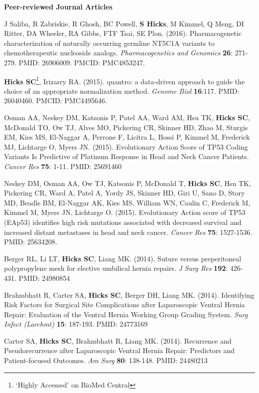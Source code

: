 \documentclass[10pt]{article}
\begin{document}
\textbf{Peer-reviewed Journal Articles}
\begin{enumerate}[label= {[\arabic*]}]
\item J Saliba, R Zabriskie, R Ghosh, BC Powell, {\bf S Hicks}, M Kimmel, Q Meng, DI Ritter, DA Wheeler, RA Gibbs, FTF Tsai, SE Plon. (2016). Pharmacogenetic characterization of naturally occurring germline NT5C1A variants to chemotherapeutic nucleoside analogs. {\it Pharmacogenetics and Genomics}  {\bf 26}: 271-279. PMID: 26906009. PMCID: PMC4853247. 
\item {\bf Hicks SC}\footnote{ `Highly Accessed' on BioMed Central}, Irizarry RA. (2015). quantro: a data-driven approach to guide the choice of an appropriate normalization method. {\it Genome Biol} {\bf 16}:117. PMID: 26040460. PMCID: PMC4495646. 
\item Osman AA, Neskey DM, Katsonis P, Patel AA, Ward AM, Hsu TK, {\bf Hicks SC}, McDonald TO, Ow TJ, Alves MO, Pickering CR, Skinner HD, Zhao M, Sturgis EM, Kies MS, El-Naggar A, Perrone F, Licitra L, Bossi P, Kimmel M, Frederick MJ, Lichtarge O, Myers JN. (2015). Evolutionary Action Score of TP53 Coding Variants Is Predictive of Platinum Response in Head and Neck Cancer Patients. {\it Cancer Res} {\bf 75}: 1-11. PMID: 25691460
\item Neskey DM, Osman AA, Ow TJ, Katsonis P, McDonald T, {\bf Hicks SC}, Hsu TK, Pickering CR, Ward A, Patel A, Yordy JS, Skinner HD, Giri U, Sano D, Story MD, Beadle BM, El-Naggar AK, Kies MS, William WN, Caulin C, Frederick M, Kimmel M, Myers JN, Lichtarge O. (2015). Evolutionary Action score of TP53 (EAp53) identifies high risk mutations associated with decreased survival and increased distant metastases in head and neck cancer. {\it Cancer Res} {\bf 75}: 1527-1536. PMID: 25634208.
\item Berger RL, Li LT, {\bf Hicks SC}, Liang MK. (2014). Suture versus preperitoneal polypropylene mesh for elective umbilical hernia repairs. {\it J Surg Res} {\bf 192}: 426-431. PMID: 24980854 
\item Brahmbhatt R, Carter SA, {\bf Hicks SC}, Berger DH, Liang MK. (2014). Identifying Risk Factors for Surgical Site Complications after Laparoscopic Ventral Hernia Repair: Evaluation of the Ventral Hernia Working Group Grading System. {\it Surg Infect (Larchmt)} {\bf 15}: 187-193. PMID: 24773169
\item Carter SA, {\bf Hicks SC}, Brahmbhatt R, Liang MK. (2014). Recurrence and Pseudorecurrence after Laparoscopic Ventral Hernia Repair: Predictors and Patient-focused Outcomes. {\it Am Surg} {\bf 80}: 138-148. PMID: 24480213

\end{enumerate}
\end{document}
